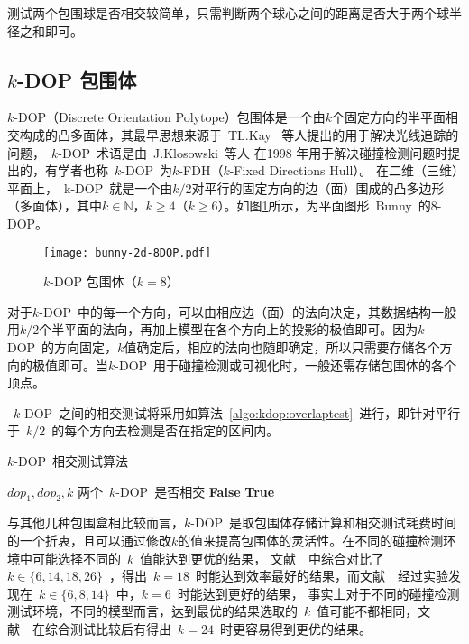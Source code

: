 测试两个包围球是否相交较简单，只需判断两个球心之间的距离是否大于两个球半径之和即可。

\subsection{$k$-DOP 包围体}

$k$-DOP（Discrete Orientation Polytope）包围体是一个由$k$个固定方向的半平面相交构成的凸多面体，其最早思想来源于~TL.Kay~\cite{Kay1986Ray}
等人提出的用于解决光线追踪的问题，~$k$-DOP~术语是由~J.Klosowski~等人\cite{klosowski1998efficient}
在1998 年用于解决碰撞检测问题时提出的，有学者也称~$k$-DOP~为$k$-FDH（$k$-Fixed
Directions Hull）\cite{weiyingmei2001}。
在二维（三维）平面上，~k-DOP~就是一个由$k/2$对平行的固定方向的边（面）围成的凸多边形（多面体），其中$k\in\mathbb{N}$，$k\geq4$（$k\geq6$）。如图\ref{fig:8dop-bunny}所示，为平面图形~Bunny~的$8$-DOP。

\begin{figure}[htbp] %
  \centering
  \texttt{[image: bunny-2d-8DOP.pdf]}
  \caption{$k$-DOP 包围体（$k=8$）}
  \label{fig:8dop-bunny}
\end{figure}

对于$k$-DOP~中的每一个方向，可以由相应边（面）的法向决定，其数据结构一般用$k/2$个半平面的法向，再加上模型在各个方向上的投影的极值即可。因为$k$-DOP~的方向固定，$k$值确定后，相应的法向也随即确定，所以只需要存储各个方向的极值即可。当$k$-DOP~用于碰撞检测或可视化时，一般还需存储包围体的各个顶点。

~$k$-DOP~之间的相交测试将采用如算法~\ref{algo:kdop:overlaptest}~进行，即针对平行于~$k/2$~的每个方向去检测是否在指定的区间内。

\begin{algorithm}
\caption{$k$-DOP~相交测试算法}
\small
\label{algo:kdop:overlaptest}
\begin{algorithmic}[1]
\Require
$dop_1, dop_2, k$ 
\Ensure
两个~$k$-DOP~是否相交
          \State \Return \textbf{False} 
      \EndIf
  \EndFor
  \State \Return \textbf{True} 
\EndFunction
\end{algorithmic}
\end{algorithm}

与其他几种包围盒相比较而言，$k$-DOP~是取包围体存储计算和相交测试耗费时间的一个折衷，且可以通过修改$k$的值来提高包围体的灵活性。在不同的碰撞检测环境中可能选择不同的~$k$~值能达到更优的结果，
文献~~中综合对比了~$k \in \{6,14,18,26\}$~，得出~$k=18$~时能达到效率最好的结果，而文献~~经过实验发现在~$k \in \{6,8,14\}$~中，$k=6$~时能达到更好的结果，
事实上对于不同的碰撞检测测试环境，不同的模型而言，达到最优的结果选取的~$k$~值可能不都相同，文献~~在综合测试比较后有得出~$k=24$~时更容易得到更优的结果。



